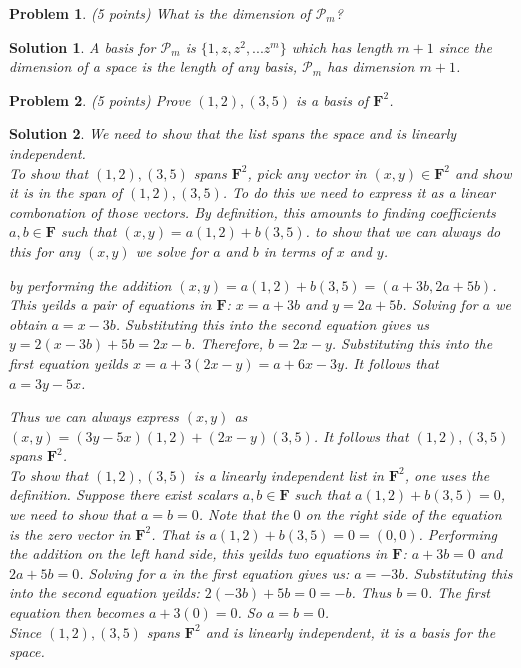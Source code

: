 \documentclass{article}
\theoremstyle{problemstyle}
\newtheorem{problem}{Problem}
\theoremstyle{problemstyle}
\newtheorem{solution}{Solution}
\theoremstyle{problemstyle}
\begin{document}
\begin{problem}
(5 points) What is the dimension of $\mathcal{P}_m$?
\end{problem}

\begin{solution}
A basis for $\mathcal{P}_m$ is $\{1,z,z^2,...z^m\}$ which has length $m+1$ since the dimension of a space is the length of any basis, $\mathcal{P}_m$ has dimension $m+1$. 
\end{solution}

\begin{problem}
(5 points) Prove $(1,2),(3,5)$ is a basis of $\textbf{F}^2$. 
\end{problem}

\begin{solution}
We need to show that the list spans the space and is linearly independent.\\

To show that $(1,2),(3,5)$ spans $\textbf{F}^2$, pick any vector in $(x,y) \in \textbf{F}^2$ and show it is in the span of $(1,2),(3,5)$. To do this we need to express it as a linear combonation of those vectors. By definition, this amounts to finding coefficients $a,b \in \textbf{F}$ such that $(x,y) = a(1,2)+b(3,5)$. to show that we can always do this for any $(x,y)$ we solve for $a$ and $b$ in terms of $x$ and $y$. 

by performing the addition $(x,y) = a(1,2)+b(3,5) = (a + 3b,2a+5b)$. This yeilds a pair of equations in $\textbf{F}$: $x = a + 3b$ and $y = 2a+5b$. Solving for $a$ we obtain $a = x-3b$. Substituting this into the second equation gives us $y = 2(x-3b)+5b = 2x-b$. Therefore, $b = 2x -y$. Substituting this into the first equation yeilds $x = a + 3(2x-y) = a + 6x - 3y$. It follows that $a = 3y - 5x$. 

Thus we can always express $(x,y)$ as $(x,y) = (3y-5x)(1,2) + (2x-y)(3,5)$. It follows that $(1,2),(3,5)$ spans $\textbf{F}^2$. \\

To show that $(1,2),(3,5)$ is a linearly independent list in $\textbf{F}^2$, one uses the definition. Suppose there exist scalars $a,b \in \textbf{F}$ such that $a(1,2)+b(3,5) = 0$, we need to show that $a = b = 0$. Note that the $0$ on the right side of the equation is the zero vector in $\textbf{F}^2$. That is $a(1,2)+b(3,5) = 0 = (0,0)$. Performing the addition on the left hand side, this yeilds two equations in $\textbf{F}$: $a+3b = 0$ and $2a + 5b = 0$. Solving for $a$ in the first equation gives us: $a = -3b$. Substituting this into the second equation yeilds: $2(-3b)+5b = 0 = -b$. Thus $b = 0$. The first equation then becomes $a +3(0)= 0$. So  $a = b = 0$.\\

Since $(1,2),(3,5)$ spans $\textbf{F}^2$ and is linearly independent, it is a basis for the space.  
\end{solution}
\end{document}
